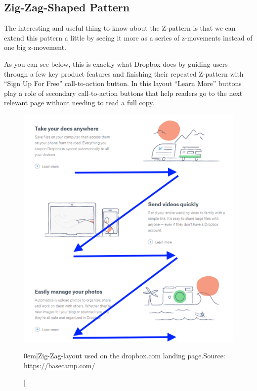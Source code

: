 \subsection{Zig-Zag-Shaped Pattern} %
\label{sub:zig_zag_shaped_pattern}

The interesting and useful thing to know about the Z-pattern is that we can extend this pattern a little by seeing it more as a series of z-movements instead of one big z-movement.

As you can see below, this is exactly what Dropbox does by guiding users through a few key product features and finishing their repeated Z-pattern with “Sign Up For Free” call-to-action button. In this layout “Learn More” buttons play a role of secondary call-to-action buttons that help readers go to the next relevant page without needing to read a full copy.

\begin{figure}%
  \includegraphics[width=1.0\textwidth]{../figures/zig-zag_dropbox.png}
  \caption[][0em]{Zig-Zag-layout used on the dropbox.com landing page.\newline Source: \url{https://basecamp.com/}}
  \label{fig:z-shape_facebook}
\end{figure}

